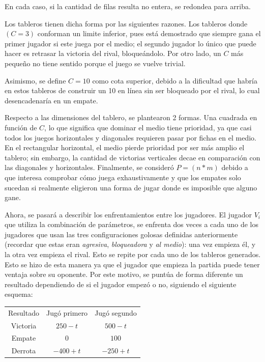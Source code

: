 \documentclass[12pt,a4paper]{article}
\begin{document}
    En cada caso, si la cantidad de filas resulta no entera, se redondea para arriba.
    
    Los tableros tienen dicha forma por las siguientes razones. Los tableros donde $(C=3)$ conforman un limite inferior, pues está demostrado que siempre gana el primer jugador si este juega por el medio; el segundo jugador lo único que puede hacer es retrasar la victoria del rival, bloqueándolo. Por otro lado, un $C$ más pequeño no tiene sentido porque el juego se vuelve trivial.
    
    Asimismo, se define $C=10$ como cota superior, debido a la dificultad que habría en estos tableros de construir un 10 en línea sin ser bloqueado por el rival, lo cual desencadenaría en un empate.
    
    Respecto a las dimensiones del tablero, se plantearon 2 formas. Una cuadrada en función de $C$, lo que significa que dominar el medio tiene prioridad, ya que casi todos los juegos horizontales y diagonales requieren pasar por fichas en el medio. En el rectangular horizontal, el medio pierde prioridad por ser más amplio el tablero; sin embargo, la cantidad de victorias verticales decae en comparación con las diagonales y horizontales. Finalmente, se consideró $P= (n * m)$ debido a que interesa comprobar cómo juega exhaustivamente y que los empates solo sucedan si realmente eligieron una forma de jugar donde es imposible que alguno gane.
    
    Ahora, se pasará a describir los enfrentamientos entre los jugadores. El jugador $V_{i}$ que utiliza la combinación de parámetros, se enfrenta dos veces a cada uno de los jugadores que usan las tres configuraciones golosas definidas anteriormente (recordar que estas eran \textit{agresiva}, \textit{bloqueadora} y \textit{al medio}): una vez empieza él, y la otra vez empieza el rival. Esto se repite por cada uno de los tableros generados. Esto se hizo de esta manera ya que el jugador que empieza la partida puede tener ventaja sobre su oponente. Por este motivo, se puntúa de forma diferente un resultado dependiendo de si el jugador empezó o no, siguiendo el siguiente esquema:
    
    \begin{center}
		\begin{tabular}{ | c || c | c | }
		\hline
		Resultado &  Jugó primero &  Jugó segundo \\ \hhline{|=#=|=|}
		    Victoria &  $250 - t$ &  $500 - t$ \\ \hline
		    Empate &  $0$ &  $100$ \\ \hline
		    Derrota &  $-400 + t$ &  $-250 + t$ \\ \hline
		\end{tabular}
    \end{center}
    
\end{document}
